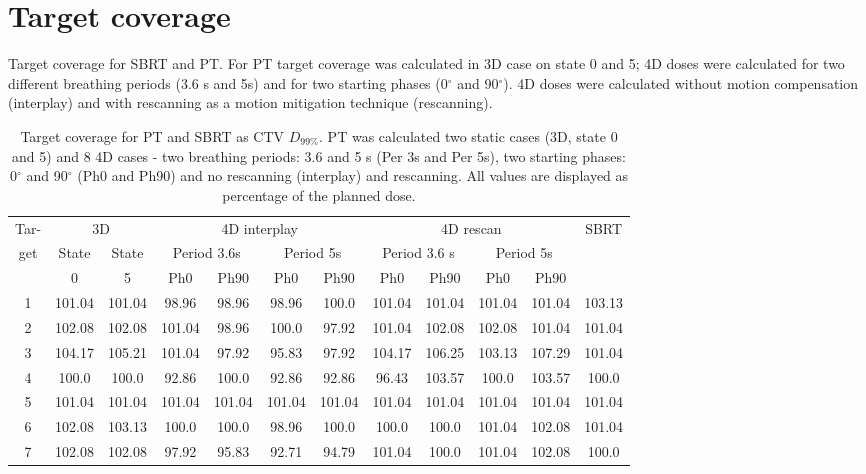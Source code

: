 \newpage
\section{Target coverage}

Target coverage for SBRT and PT. For PT target coverage was calculated in 3D case on state 0 and 5; 4D doses were calculated for two different breathing periods (3.6 s and 5s)
and for two starting phases (0$^\circ$ and 90$^\circ$). 4D doses were calculated without motion compensation (interplay) and with rescanning as a motion mitigation technique (rescanning).

\begin{table}[H]
  \centering
  \footnotesize
  \caption{Target coverage for PT and SBRT as CTV $D_{99\%}$. PT was calculated two static cases (3D, state 0 and 5) and 8 4D cases - two breathing periods: 3.6 and 5 s (Per 3s and Per 5s),
  two starting phases: 0$^\circ$ and 90$^\circ$ (Ph0 and Ph90) and no rescanning (interplay) and rescanning. All values are displayed as percentage of the planned dose.}
  \begin{tabular}{|c|c|c|c|c|c|c|c|c|c|c|c|}
  \hline
 Tar- & \multicolumn{2}{|c|}{3D} & \multicolumn{4}{|c|}{4D interplay} & \multicolumn{4}{|c|}{4D rescan} & \multirow{3}{*}{SBRT} \\ 
  get & State & State & \multicolumn{2}{|c|}{Period 3.6s} & \multicolumn{2}{|c|}{Period 5s} & \multicolumn{2}{|c|}{Period 3.6 s} & \multicolumn{2}{|c|}{Period 5s} & \\
  &   0 &  5   & Ph0 & Ph90 & Ph0 & Ph90 & Ph0 & Ph90 & Ph0 & Ph90 & \\
 \hline \hline 
1 & 101.04 & 101.04 & 98.96 & 98.96 & 98.96 & 100.0 & 101.04 & 101.04 & 101.04 & 101.04 & 103.13\\
2 & 102.08 & 102.08 & 101.04 & 98.96 & 100.0 & 97.92 & 101.04 & 102.08 & 102.08 & 101.04 & 101.04\\
3 & 104.17 & 105.21 & 101.04 & 97.92 & 95.83 & 97.92 & 104.17 & 106.25 & 103.13 & 107.29 & 101.04\\
4 & 100.0 & 100.0 & 92.86 & 100.0 & 92.86 & 92.86 & 96.43 & 103.57 & 100.0 & 103.57 & 100.0\\
5 & 101.04 & 101.04 & 101.04 & 101.04 & 101.04 & 101.04 & 101.04 & 101.04 & 101.04 & 101.04 & 101.04\\
6 & 102.08 & 103.13 & 100.0 & 100.0 & 98.96 & 100.0 & 100.0 & 100.0 & 101.04 & 102.08 & 101.04\\
7 & 102.08 & 102.08 & 97.92 & 95.83 & 92.71 & 94.79 & 101.04 & 100.0 & 101.04 & 102.08 & 100.0\\

\end{tabular}
\end{table}
